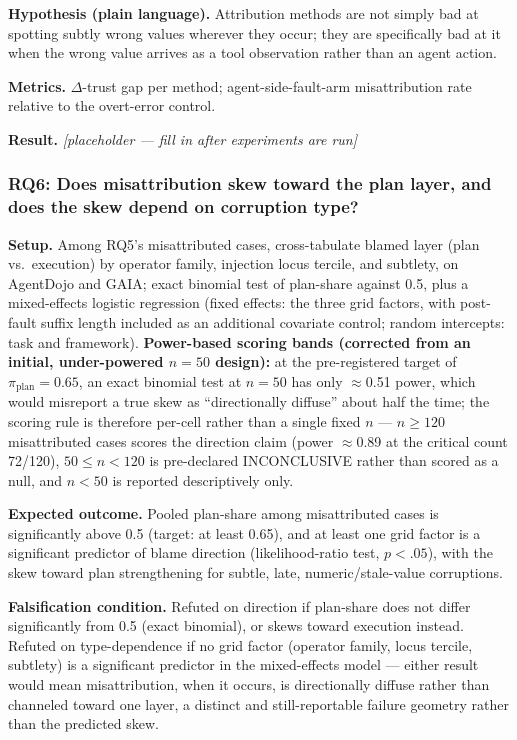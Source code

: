 \documentclass[11pt]{article}
\newcommand{\ph}{\textit{[placeholder --- fill in after experiments are run]}}
\begin{document}
\textbf{Hypothesis (plain language).} Attribution methods are not simply bad at spotting subtly wrong values wherever they occur; they are specifically bad at it when the wrong value arrives as a tool observation rather than an agent action.

\textbf{Metrics.} $\Delta$-trust gap per method; agent-side-fault-arm misattribution rate relative to the overt-error control.

\textbf{Result.} \ph

\subsubsection{RQ6: Does misattribution skew toward the plan layer, and does the skew depend on corruption type?}
\textbf{Setup.} Among RQ5's misattributed cases, cross-tabulate blamed layer (plan vs.\ execution) by operator family, injection locus tercile, and subtlety, on AgentDojo and GAIA; exact binomial test of plan-share against 0.5, plus a mixed-effects logistic regression (fixed effects: the three grid factors, with post-fault suffix length included as an additional covariate control; random intercepts: task and framework). \textbf{Power-based scoring bands (corrected from an initial, under-powered $n{=}50$ design):} at the pre-registered target of $\pi_{\text{plan}} = 0.65$, an exact binomial test at $n=50$ has only $\approx$0.51 power, which would misreport a true skew as ``directionally diffuse'' about half the time; the scoring rule is therefore per-cell rather than a single fixed $n$ --- $n \geq 120$ misattributed cases scores the direction claim (power $\approx$0.89 at the critical count 72/120), $50 \leq n < 120$ is pre-declared INCONCLUSIVE rather than scored as a null, and $n < 50$ is reported descriptively only.

\textbf{Expected outcome.} Pooled plan-share among misattributed cases is significantly above 0.5 (target: at least 0.65), and at least one grid factor is a significant predictor of blame direction (likelihood-ratio test, $p < .05$), with the skew toward plan strengthening for subtle, late, numeric/stale-value corruptions.

\textbf{Falsification condition.} Refuted on direction if plan-share does not differ significantly from 0.5 (exact binomial), or skews toward execution instead. Refuted on type-dependence if no grid factor (operator family, locus tercile, subtlety) is a significant predictor in the mixed-effects model --- either result would mean misattribution, when it occurs, is directionally diffuse rather than channeled toward one layer, a distinct and still-reportable failure geometry rather than the predicted skew.
\end{document}
